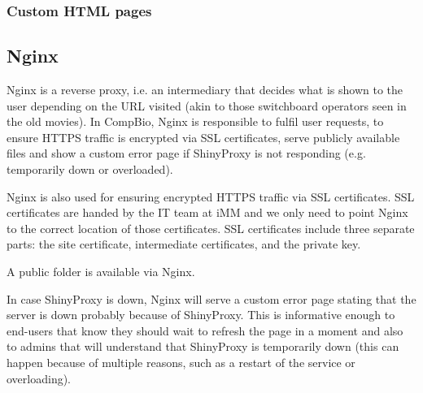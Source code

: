 
\subsubsection{Custom HTML pages}

\subsection{Nginx}

Nginx is a reverse proxy, i.e. an intermediary that decides what is shown to the user depending on the URL visited (akin to those switchboard operators seen in the old movies). In CompBio, Nginx is responsible to fulfil user requests, to ensure HTTPS traffic is encrypted via SSL certificates, serve publicly available files and show a custom error page if ShinyProxy is not responding (e.g. temporarily down or overloaded).

Nginx is also used for ensuring encrypted HTTPS traffic via SSL certificates. SSL certificates are handed by the IT team at iMM and we only need to point Nginx to the correct location of those certificates. SSL certificates include three separate parts: the site certificate, intermediate certificates, and the private key.

A public folder is available via Nginx.

In case ShinyProxy is down, Nginx will serve a custom error page stating that the server is down probably because of ShinyProxy. This is informative enough to end-users that know they should wait to refresh the page in a moment and also to admins that will understand that ShinyProxy is temporarily down (this can happen because of multiple reasons, such as a restart of the service or overloading).



